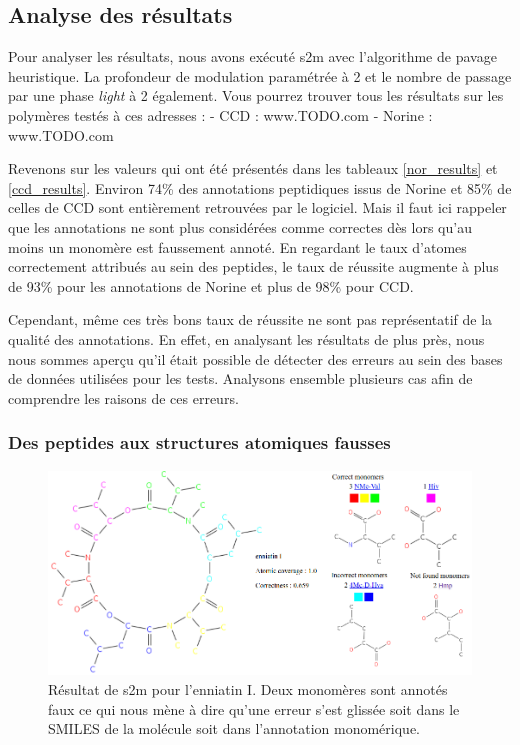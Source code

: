 \subsection{Analyse des résultats}

Pour analyser les résultats, nous avons exécuté s2m avec l'algorithme de pavage heuristique.
La profondeur de modulation paramétrée à 2 et le nombre de passage par une phase \textit{light} à 2 également.
Vous pourrez trouver tous les résultats sur les polymères testés à ces adresses :
- CCD : www.TODO.com
- Norine : www.TODO.com


Revenons sur les valeurs qui ont été présentés dans les tableaux \ref{nor_results} et \ref{ccd_results}.
Environ 74\% des annotations peptidiques issus de Norine et 85\% de celles de CCD sont entièrement retrouvées par le logiciel.
Mais il faut ici rappeler que les annotations ne sont plus considérées comme correctes dès lors qu'au moins un monomère est faussement annoté.
En regardant le taux d'atomes correctement attribués au sein des peptides, le taux de réussite augmente à plus de 93\% pour les annotations de Norine et plus de 98\% pour CCD.

Cependant, même ces très bons taux de réussite ne sont pas représentatif de la qualité des annotations.
En effet, en analysant les résultats de plus près, nous nous sommes aperçu qu'il était possible de détecter des erreurs au sein des bases de données utilisées pour les tests.
Analysons ensemble plusieurs cas afin de comprendre les raisons de ces erreurs.


\subsubsection{Des peptides aux structures atomiques fausses}

\begin{figure}[!ht]
  \begin{center}
    \includegraphics[width=450px]{Figures/s2m/results/s2m_enniati.png}
    \caption{\label{s2m_enniati}Résultat de s2m pour l'enniatin I.
    Deux monomères sont annotés faux ce qui nous mène à dire qu'une erreur s'est glissée soit dans le SMILES de la molécule soit dans l'annotation monomérique.}
  \end{center}
\end{figure}

